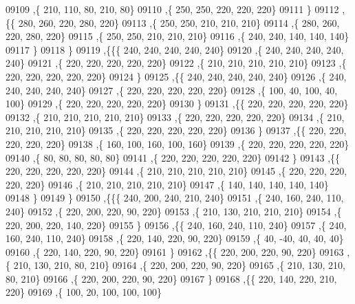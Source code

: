 \begin{DoxyCode}
09109     ,\{   210,   110,    80,   210,    80\}
09110     ,\{   250,   250,   220,   220,   220\}
09111     \}
09112    ,\{\{   280,   260,   220,   280,   220\}
09113     ,\{   250,   250,   210,   210,   210\}
09114     ,\{   280,   260,   220,   280,   220\}
09115     ,\{   250,   250,   210,   210,   210\}
09116     ,\{   240,   240,   140,   140,   140\}
09117     \}
09118    \}
09119   ,\{\{\{   240,   240,   240,   240,   240\}
09120     ,\{   240,   240,   240,   240,   240\}
09121     ,\{   220,   220,   220,   220,   220\}
09122     ,\{   210,   210,   210,   210,   210\}
09123     ,\{   220,   220,   220,   220,   220\}
09124     \}
09125    ,\{\{   240,   240,   240,   240,   240\}
09126     ,\{   240,   240,   240,   240,   240\}
09127     ,\{   220,   220,   220,   220,   220\}
09128     ,\{   100,    40,   100,    40,   100\}
09129     ,\{   220,   220,   220,   220,   220\}
09130     \}
09131    ,\{\{   220,   220,   220,   220,   220\}
09132     ,\{   210,   210,   210,   210,   210\}
09133     ,\{   220,   220,   220,   220,   220\}
09134     ,\{   210,   210,   210,   210,   210\}
09135     ,\{   220,   220,   220,   220,   220\}
09136     \}
09137    ,\{\{   220,   220,   220,   220,   220\}
09138     ,\{   160,   100,   160,   100,   160\}
09139     ,\{   220,   220,   220,   220,   220\}
09140     ,\{    80,    80,    80,    80,    80\}
09141     ,\{   220,   220,   220,   220,   220\}
09142     \}
09143    ,\{\{   220,   220,   220,   220,   220\}
09144     ,\{   210,   210,   210,   210,   210\}
09145     ,\{   220,   220,   220,   220,   220\}
09146     ,\{   210,   210,   210,   210,   210\}
09147     ,\{   140,   140,   140,   140,   140\}
09148     \}
09149    \}
09150   ,\{\{\{   240,   200,   240,   210,   240\}
09151     ,\{   240,   160,   240,   110,   240\}
09152     ,\{   220,   200,   220,    90,   220\}
09153     ,\{   210,   130,   210,   210,   210\}
09154     ,\{   220,   200,   220,   140,   220\}
09155     \}
09156    ,\{\{   240,   160,   240,   110,   240\}
09157     ,\{   240,   160,   240,   110,   240\}
09158     ,\{   220,   140,   220,    90,   220\}
09159     ,\{    40,   -40,    40,    40,    40\}
09160     ,\{   220,   140,   220,    90,   220\}
09161     \}
09162    ,\{\{   220,   200,   220,    90,   220\}
09163     ,\{   210,   130,   210,    80,   210\}
09164     ,\{   220,   200,   220,    90,   220\}
09165     ,\{   210,   130,   210,    80,   210\}
09166     ,\{   220,   200,   220,    90,   220\}
09167     \}
09168    ,\{\{   220,   140,   220,   210,   220\}
09169     ,\{   100,    20,   100,   100,   100\}

\end{DoxyCode}
